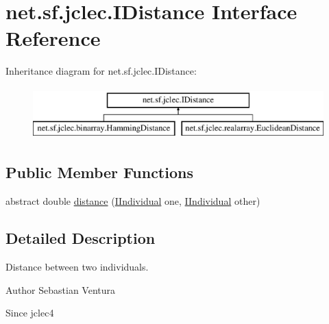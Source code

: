 \hypertarget{interfacenet_1_1sf_1_1jclec_1_1_i_distance}{\section{net.\-sf.\-jclec.\-I\-Distance Interface Reference}
\label{interfacenet_1_1sf_1_1jclec_1_1_i_distance}
}
Inheritance diagram for net.\-sf.\-jclec.\-I\-Distance\-:\begin{figure}[H]
\begin{center}
\leavevmode
\includegraphics[height=2.000000cm]{interfacenet_1_1sf_1_1jclec_1_1_i_distance}
\end{center}
\end{figure}
\subsection*{Public Member Functions}
\begin{DoxyCompactItemize}
\item 
abstract double \hyperlink{interfacenet_1_1sf_1_1jclec_1_1_i_distance_a6f0220da1f5f7926f0ecc15c30b8a7d6}{distance} (\hyperlink{interfacenet_1_1sf_1_1jclec_1_1_i_individual}{I\-Individual} one, \hyperlink{interfacenet_1_1sf_1_1jclec_1_1_i_individual}{I\-Individual} other)
\end{DoxyCompactItemize}


\subsection{Detailed Description}
Distance between two individuals.

\begin{DoxyAuthor}{Author}
Sebastian Ventura 
\end{DoxyAuthor}
\begin{DoxySince}{Since}
jclec4 
\end{DoxySince}


